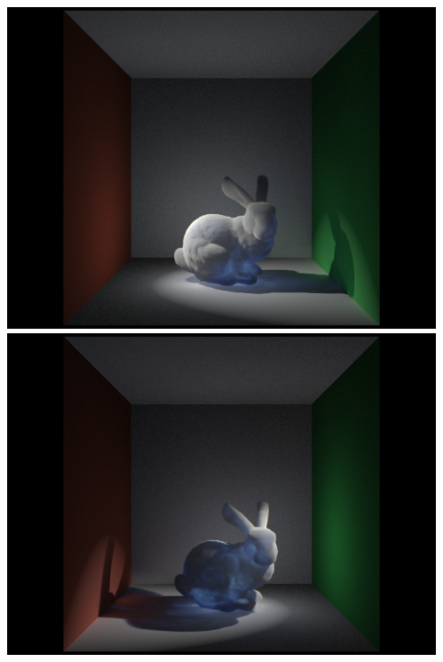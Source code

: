 \documentclass[10pt,compress,professionalfont]{beamer}
\begin{document}
\begin{frame}[c]{}
\begin{columns}
\begin{column}{0.5\textwidth}
        \end{column}
        \begin{column}{0.5\textwidth}
            \includegraphics[width=\textwidth]{../img/bunny_spot/spot_left}\\
            \includegraphics[width=\textwidth]{../img/bunny_spot/spot_right}\\
        \end{column}
    \end{columns}

\end{frame}
\end{document}
